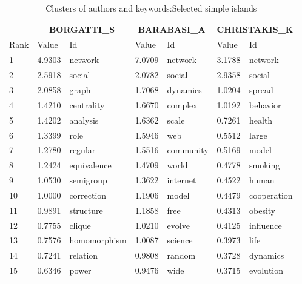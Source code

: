 \documentclass[11pt]{article} %
\begin{document}
\begin{center}
\begin{longtable}{p{0.7cm}|p{1.3cm}|p{2.6cm}||p{1.3cm}|p{2.6cm}||p{1.3cm}|p{2.6cm}}
\caption{Clusters of authors and keywords:\label{akw} Selected simple islands} \\ \hline 
\renewcommand{\arraystretch}{0.6}
& \multicolumn{2}{c}{BORGATTI\_S}		& \multicolumn{2}{c}{BARABASI\_A}  & \multicolumn{2}{c}{CHRISTAKIS\_K}\\ \hline \hline
      Rank 	&   Value  & Id		    & 	   Value  & Id		       &	 Value  & Id	    \\ \hline
         1 	&  4.9303  & network	    &	    7.0709  & network	       &	  3.1788 &  network	    \\
         2 	&  2.5918  & social	    &	    2.0782  & social	       &	  2.9358 &  social	    \\
         3 	&  2.0858  & graph	    &	    1.7068  & dynamics	       &	  1.0204 &  spread	    \\
         4 	&  1.4210  & centrality	    &	    1.6670  & complex	       &	  1.0192 &  behavior	    \\
         5 	&  1.4202  & analysis	    &	    1.6362  & scale	       &	  0.7261 &  health	    \\
         6 	&  1.3399  & role	    &	    1.5946  & web	       &	  0.5512 &  large	    \\
         7 	&  1.2780  & regular	    &	    1.5516  & community	       &	  0.5169 &  model	    \\
         8 	&  1.2424  & equivalence    &	    1.4709  & world	       &	  0.4778 &  smoking	    \\
         9 	&  1.0530  & semigroup	    &	    1.3622  & internet	       &	  0.4522 &  human	    \\
        10 	&  1.0000  & correction	    &	    1.1906  & model	       &	  0.4479 &  cooperation	    \\
        11 	&  0.9891  & structure	    &	    1.1858  & free	       &	  0.4313 &  obesity	    \\
        12 	&  0.7755  & clique	    &	    1.0210  & evolve	       &	  0.4125 &  influence	    \\
        13 	&  0.7576  & homomorphism   &	    1.0087  & science	       &	  0.3973 &  life	    \\
        14 	&  0.7241  & relation	    &	    0.9808  & random	       &	  0.3728 &  dynamics	    \\
        15 	&  0.6346  & power	    &	    0.9476  & wide	       &	  0.3715 &  evolution	    \\

\end{longtable}
\end{center}
\end{document}
